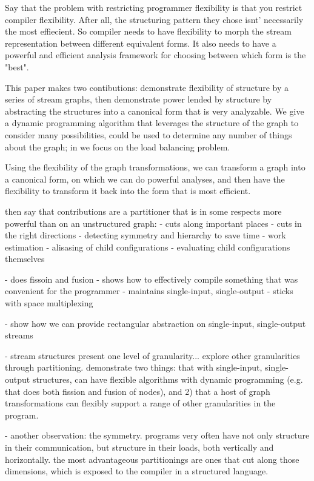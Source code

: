 Say that the problem with restricting programmer flexibility is that
you restrict compiler flexibility.  After all, the structuring pattern
they chose isnt' necessarily the most effiecient.  So compiler needs
to have flexibility to morph the stream representation between
different equivalent forms.  It also needs to have a powerful and
efficient analysis framework for choosing between which form is the
"best".

This paper makes two contibutions: demonstrate flexibility of
structure by a series of stream graphs, then demonstrate power lended
by structure by abstracting the structures into a canonical form that
is very analyzable.  We give a dynamic programming algorithm that
leverages the structure of the graph to consider many possibilities, 
 could be used to determine any number of things about the graph; in
we focus on the load balancing problem.

Using the flexibility of the graph transformations, we can transform a
graph into a canonical form, on which we can do powerful analyses, and
then have the flexibility to transform it back into the form that is
most efficient.

 then say that contributions are a partitioner that is in some
respects more powerful than on an unstructured graph:
  - cuts along important places
  - cuts in the right directions
  - detecting symmetry and hierarchy to save time
    - work estimation
    - alisasing of child configurations
    - evaluating child configurations themselves

- does fissoin and fusion
- shows how to effectively compile something that was convenient for the programmer
- maintains single-input, single-output
- sticks with space multiplexing

- show how we can provide rectangular abstraction on single-input, single-output streams

- stream structures present one level of granularity... explore other
granularities through partitioning.  demonstrate two things: that with
single-input, single-output structures, can have flexible algorithms
with dynamic programming (e.g. that does both fission and fusion of
nodes), and 2) that a host of graph transformations can flexibly
support a range of other granularities in the program.

- another observation: the symmetry.  programs very often have not
only structure in their communication, but structure in their loads,
both vertically and horizontally.  the most advantageous partitionings
are ones that cut along those dimensions, which is exposed to the
compiler in a structured language.

